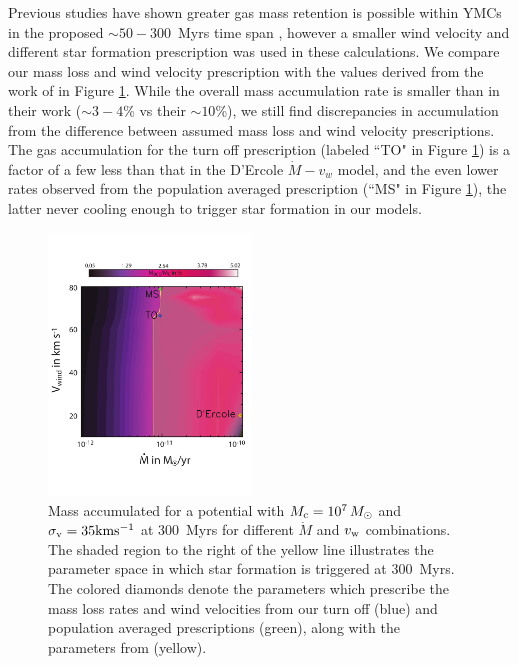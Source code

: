 \documentclass[fleqn,usenatbib]{mnras}
\begin{document}
 Previous studies have shown greater gas mass retention is possible within YMCs in the proposed $\sim 50 - 300$~Myrs time span \citep{dercole2008,dercole2011,bekki2011}, however a smaller wind velocity and different star formation prescription was used in these calculations.
 We compare our mass loss and wind velocity prescription with the values derived from the work of \cite{dercole2008} in Figure \ref{fig:mdotvw}.  While the overall mass accumulation rate is smaller than in their work ($\sim 3-4$\% vs their $\sim 10$\%), we still find discrepancies in accumulation from the difference between assumed mass loss and wind velocity prescriptions.  The gas accumulation for the turn off prescription (labeled ``TO" in Figure \ref{fig:mdotvw}) is a factor of a few less than that in the D'Ercole $\dot{M}-v_w$ model, and the even lower rates observed from the population averaged prescription (``MS" in Figure \ref{fig:mdotvw}), the latter never cooling enough to trigger star formation in our models.
 



\begin{figure}
\centering\includegraphics[width=0.48\textwidth]{mdotvw_new_mod3.pdf}
\caption{Mass accumulated for a potential with $M_{\rm c} = 10^7 \, M_\odot$ and $\sigma_{\rm v} = 35 {\rm km s^{-1}}$ at 300~Myrs for different $\dot{M}$ and $v_{\rm w}$ combinations.  The shaded region to the right of the yellow line illustrates the parameter space in which star formation is triggered at 300~Myrs.  The colored diamonds denote the parameters which prescribe the mass loss rates and wind velocities from our turn off (blue) and population averaged prescriptions (green), along with the parameters from \citep{dercole2008} (yellow).}
\label{fig:mdotvw}
\end{figure} 
\end{document}
